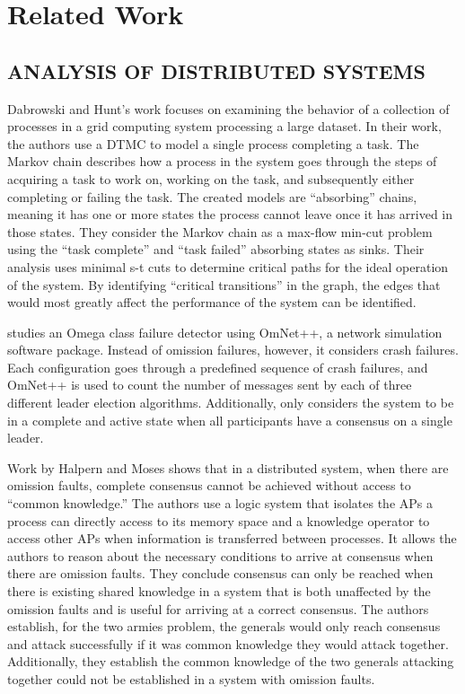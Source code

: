 \chapter{Related Work}

\section{ANALYSIS OF DISTRIBUTED SYSTEMS}

Dabrowski and Hunt's work\cite{markov-distributed} focuses on examining the behavior of a collection of processes in a grid computing system processing a large dataset.
In their work, the authors use a \ac{DTMC} to model a single process completing a task.
The Markov chain describes how a process in the system goes through the steps of acquiring a task to work on, working on the task, and subsequently either completing or failing the task.
The created models are ``absorbing'' chains, meaning it has one or more states the process cannot leave once it has arrived in those states.
They consider the Markov chain as a max-flow min-cut problem using the ``task complete'' and ``task failed'' absorbing states as sinks.
Their analysis uses minimal s-t cuts to determine critical paths for the ideal operation of the system.
By identifying ``critical transitions'' in the graph, the edges that would most greatly affect the performance of the system can be identified.

\cite{LEADERELECTIONEVAL} studies an Omega class failure detector using OmNet++\cite{OMNET}, a network simulation software package.
Instead of omission failures, however, it considers crash failures.
Each configuration goes through a predefined sequence of crash failures, and OmNet++ is used to count the number of messages sent by each of three different leader election algorithms.
Additionally, \cite{LEADERELECTIONEVAL} only considers the system to be in a complete and active state when all participants have a consensus on a single leader.

Work by Halpern and Moses\cite{knowledge-distributed} shows that in a distributed system, when there are omission faults, complete consensus cannot be achieved without access to ``common knowledge.''
The authors use a logic system that isolates the \acp{AP} a process can directly access to its memory space and a knowledge operator to access other \acp{AP} when information is transferred between processes.
It allows the authors to reason about the necessary conditions to arrive at consensus when there are omission faults.
They conclude consensus can only be reached when there is existing shared knowledge in a system that is both unaffected by the omission faults and is useful for arriving at a correct consensus.
The authors establish, for the two armies problem, the generals would only reach consensus and attack successfully if it was common knowledge they would attack together.
Additionally, they establish the common knowledge of the two generals attacking together could not be established in a system with omission faults.

